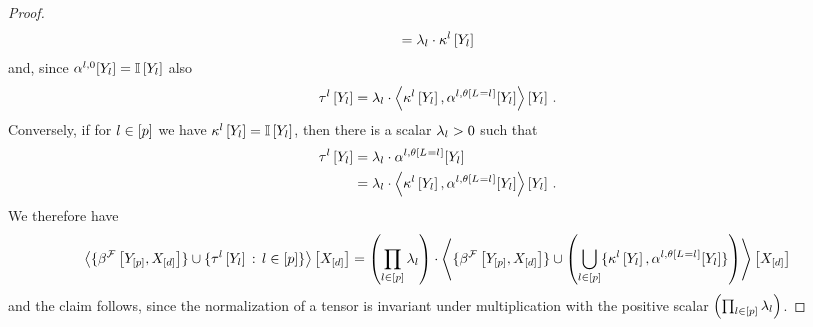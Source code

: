 \begin{proof}
\begin{align*}
        = \lambda_{l} \cdot \kappa^{l}\left[Y_{l}\right]
    \end{align*}
    and, since $\alpha^{l,0}[Y_{l}] = \mathbb{I}\left[Y_{l}\right]$ also
    \begin{align*}
        \tau^{l}\left[Y_{l}\right]
        = \lambda_{l} \cdot \left\langle \kappa^{l}\left[Y_{l}\right],\alpha^{l,\theta\left[L_{}=l_{}\right]}[Y_{l}]\right\rangle \left[ Y_{l} \right] \, .
    \end{align*}
    Conversely, if for $l\in[p]$ we have $\kappa^{l}\left[Y_{l}\right]=\mathbb{I}\left[Y_{l}\right]$, then there is a scalar $\lambda_{l}>0$ such that
    \begin{align*}
        \tau^{l}\left[Y_{l}\right]
        &= \lambda_{l} \cdot \alpha^{l,\theta\left[L_{}=l_{}\right]}[Y_{l}] \\
        &= \lambda_{l} \cdot \left\langle \kappa^{l}\left[Y_{l}\right],\alpha^{l,\theta\left[L_{}=l_{}\right]}[Y_{l}]\right\rangle \left[ Y_{l} \right] \, . \\
    \end{align*}
    We therefore have
    \begin{align*}
        \left\langle 
            \{\beta^{\mathcal{F}}\left[Y_{[p]},X_{[d]}\right]\}
            \cup \{\tau^{l}\left[Y_{l}\right]\,:\,l\in[p]\}
        \right\rangle \left[ X_{[d]} \right]
        =\left(\prod_{l\in[p]}\lambda_{l}\right)\cdot\left\langle 
            \{\beta^{\mathcal{F}}\left[Y_{[p]},X_{[d]}\right]\}
            \cup \left(\bigcup_{l\in[p]}\{\kappa^{l}\left[Y_{l}\right],\alpha^{l,\theta\left[L_{}=l_{}\right]}[Y_{l}]\}\right)
        \right\rangle \left[ X_{[d]} \right]
    \end{align*}
    and the claim follows, since the normalization of a tensor is invariant under multiplication with the positive scalar $\left(\prod_{l\in[p]}\lambda_{l}\right)$.
\end{proof}



